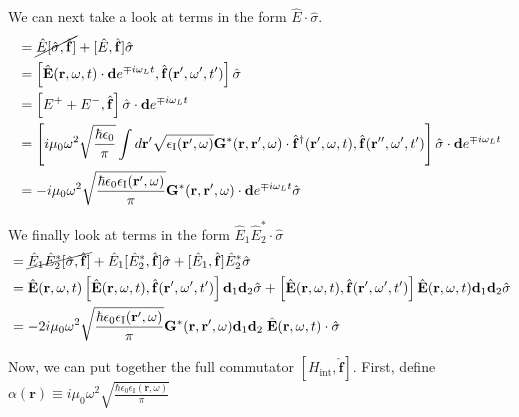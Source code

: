 \documentclass[a4paper, 11pt]{article}
\numberwithin{equation}{section}
\begin{document}
We can next take a look at terms in the form $\hat{E}\cdot\hat{\sigma}$.
\begin{align*}
  [\hat{E}\cdot\hat{\sigma}, \hat{\mathbf{f}}] &= \cancel{\hat{E}[\hat{\sigma},
  \hat{\mathbf{f}}]} + [\hat{E}, \hat{\mathbf{f}}]\hat{\sigma}\\ &=
  \left[\hat{\mathbf{E}}(\mathbf{r}, \omega, t) \cdot \mathbf{d} e^{\mp i\omega_Lt},
  \hat{\mathbf{f}}(\mathbf{r}', \omega', t')\right]\hat{\sigma}\\ &= \left[ E^+ + E^-,
  \hat{\mathbf{f}} \right]\hat{\sigma} \cdot \mathbf{d}e^{\mp i\omega_Lt}\\ &=
  \left[i\mu_0\omega^2\sqrt{\frac{\hbar\epsilon_0}{\pi}} \int d\mathbf{r}'
  \sqrt{\epsilon_{\text{I}}(\mathbf{r}', \omega)} \mathbf{G}^*(\mathbf{r, r}', \omega)
  \cdot \hat{\mathbf{f}}^\dagger(\mathbf{r'}, \omega, t),
  \hat{\mathbf{f}}(\mathbf{r}'', \omega', t')\right] \hat{\sigma}\cdot \mathbf{d}e^{\mp
  i\omega_Lt}\\ &= -i\mu_0\omega^2 \sqrt{\frac{\hbar\epsilon_0
  \epsilon_\text{I}(\mathbf{r}', \omega) }{\pi}} \mathbf{G}^*(\mathbf{r, r'}, \omega)
  \cdot \mathbf{d}e^{\mp i\omega_Lt} \hat{\sigma}
\end{align*}

\color{red}
We finally look at terms in the form $\hat{E}_1\hat{E}_2^* \cdot \hat{\sigma}$
\begin{align*}
  [\hat{E}_1\hat{E}_2^*\cdot\hat{\sigma}, \hat{\mathbf{f}}] &= \cancel{\hat{E}_1
  \hat{E}_2^*[\hat{\sigma}, \hat{\mathbf{f}}]} + \hat{E}_1 [\hat{E}_2^*,
  \hat{\mathbf{f}}] \hat{\sigma} + [\hat{E}_1, \hat{\mathbf{f}}]
  \hat{E}_2^*\hat{\sigma}\\ &= \hat{\mathbf{E}}(\mathbf{r}, \omega, t) \left[
  \hat{\mathbf{E}}(\mathbf{r}, \omega, t), \hat{\mathbf{f}}(\mathbf{r}', \omega',
  t') \right] \mathbf{d}_1\mathbf{d}_2 \hat{\sigma} +  \left[
  \hat{\mathbf{E}}(\mathbf{r}, \omega, t), \hat{\mathbf{f}}(\mathbf{r}', \omega', t')
  \right] \hat{\mathbf{E}}(\mathbf{r}, \omega, t) \mathbf{d}_1\mathbf{d}_2
    \hat{\sigma}\\ &= -2i\mu_0\omega^2 \sqrt{\frac{\hbar\epsilon_0
  \epsilon_\text{I}(\mathbf{r}', \omega) }{\pi}} \mathbf{G}^*(\mathbf{r, r'},
  \omega) \mathbf{d}_1\mathbf{d}_2 \; \hat{\mathbf{E}}(\mathbf{r}, \omega, t) \cdot
  \hat{\sigma}
\end{align*}
\color{black}

Now, we can put together the full commutator $[H_\text{int}, \hat{\mathbf{f}}]$.
First, define $\alpha(\mathbf{r}) \equiv
i\mu_0\omega^2\sqrt{\frac{\hbar\epsilon_0\epsilon_{\text{I}}(\mathbf{r},
\omega)}{\pi}}$
\end{document}
